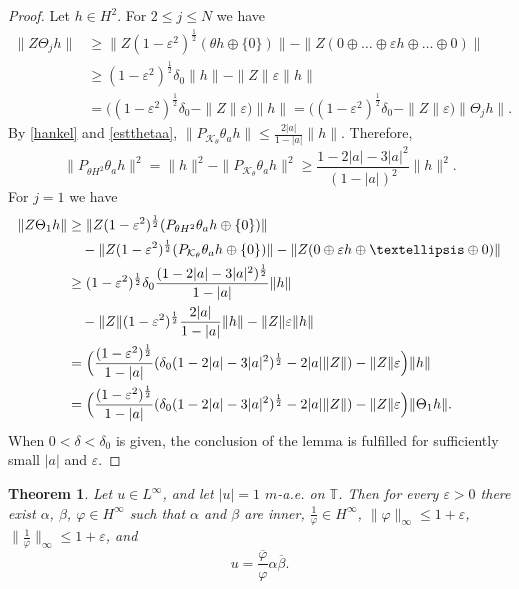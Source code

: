 \documentclass[a4paper,oneside,11pt]{amsart}
\numberwithin{equation}{section}
\theoremstyle{plain}
\newtheorem{theoremcite}{Theorem}
\theoremstyle{definition}
\begin{document}
\begin{proof}
Let $h\in H^2$. For $2\leq j \leq N$ we have 
\begin{align*} \|Z\Theta_j h\|&\geq\|Z(1-\varepsilon^2)^{\frac{1}{2}}(\theta h\oplus\{0\})\|-\|Z(0\oplus\ldots\oplus\varepsilon h\oplus\ldots \oplus 0)\|\\&
\geq(1-\varepsilon^2)^{\frac{1}{2}}\delta_0\|h\|-\|Z\|\varepsilon \|h\|\\&=
\bigl((1-\varepsilon^2)^{\frac{1}{2}}\delta_0-\|Z\|\varepsilon\bigr) \|h\|=
\bigl((1-\varepsilon^2)^{\frac{1}{2}}\delta_0-\|Z\|\varepsilon\bigr) \|\Theta_jh\|.
\end{align*}
By \eqref{hankel} and \eqref{estthetaa}, $\|P_{\mathcal K_\theta}\theta_a h\|\leq\frac{2|a|}{1-|a|}\|h\|$. Therefore, 
\begin{equation*} \|P_{\theta H^2}\theta_a h\|^2=\|h\|^2-\|P_{\mathcal K_\theta}\theta_a h\|^2\geq \frac{1-2|a|-3|a|^2}{(1-|a|)^2}\|h\|^2.
\end{equation*}
For $j=1$  we have 
\begin{align*} \|Z\Theta_1 h\|&\geq\|Z(1-\varepsilon^2)^{\frac{1}{2}}(P_{\theta H^2}\theta_a h\oplus\{0\})\|\\&\quad
-\|Z(1-\varepsilon^2)^{\frac{1}{2}}(P_{\mathcal K_\theta}\theta_a h\oplus\{0\})\|
-\|Z(0\oplus\varepsilon h\oplus\ldots \oplus 0)\|\\&
\geq(1-\varepsilon^2)^{\frac{1}{2}}\delta_0\frac{(1-2|a|-3|a|^2)^{\frac{1}{2}}}{1-|a|}\|h\|\\&\quad -
\|Z\|(1-\varepsilon^2)^{\frac{1}{2}}\frac{2|a|}{1-|a|}\|h\|-
\|Z\|\varepsilon \|h\|\\&=
\Bigl(\frac{(1-\varepsilon^2)^{\frac{1}{2}}}{1-|a|}(\delta_0(1-2|a|-3|a|^2)^{\frac{1}{2}} -2|a|\|Z\|)-\|Z\|\varepsilon\Bigr) \|h\|\\&=
\Bigl(\frac{(1-\varepsilon^2)^{\frac{1}{2}}}{1-|a|}(\delta_0(1-2|a|-3|a|^2)^{\frac{1}{2}} -2|a|\|Z\|)-\|Z\|\varepsilon\Bigr) \|\Theta_1h\|.
\end{align*}
When $0<\delta<\delta_0$ is given, the conclusion of the lemma is fulfilled for sufficiently small $|a|$ and $\varepsilon$.
\end{proof}

\begin{theoremcite}\label{theorembb}\cite{hjelle} Let $u\in L^\infty$, and let $|u|=1$ $m$-a.e. 
on $\mathbb T$. Then for every $\varepsilon>0$ there exist  $\alpha$, $\beta$, $\varphi\in H^\infty$ such that $\alpha$ and $\beta$ are inner,  $\frac{1}{\varphi}\in H^\infty$, $\|\varphi\|_\infty\leq 1+\varepsilon$, 
$\|\frac{1}{\varphi}\|_\infty\leq 1+\varepsilon$, 
and 
\begin{equation*}
u=\frac{\overline\varphi}{\varphi}\alpha\overline\beta. 
\end{equation*}
\end{theoremcite}
\end{document}
